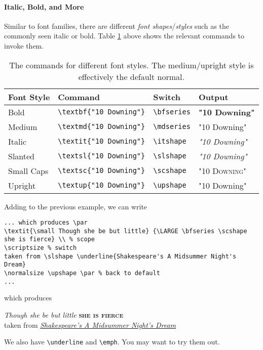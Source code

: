 \paragraph{Italic, Bold, and More}
Similar to font families, there are different \textit{font shapes}/\textit{styles} such as the commonly seen italic or bold. Table \ref{tab:fontshape} above shows the relevant commands to invoke them.
\begin{table}
\begin{tabularx}{\textwidth}{|l|X|l|l|}
\hline
Font Style & Command & Switch & Output \\
\hline
Bold & \texttt{\textbackslash textbf\{"10 Downing"\}}& \texttt{\textbackslash bfseries} & \textbf{"10 Downing"} \\
\hline
Medium & \texttt{\textbackslash textmd\{"10 Downing"\}}& \texttt{\textbackslash mdseries} & \textmd{"10 Downing"} \\
\hline
Italic & \texttt{\textbackslash textit\{"10 Downing"\}}& \texttt{\textbackslash itshape} & \textit{"10 Downing"} \\
\hline
Slanted & \texttt{\textbackslash textsl\{"10 Downing"\}}& \texttt{\textbackslash slshape} & \textsl{"10 Downing"} \\
\hline
Small Caps & \texttt{\textbackslash textsc\{"10 Downing"\}}& \texttt{\textbackslash scshape} & \textsc{"10 Downing"} \\
\hline
Upright & \texttt{\textbackslash textup\{"10 Downing"\}}& \texttt{\textbackslash upshape} & \textup{"10 Downing"} \\
\hline
\end{tabularx}
\caption{The commands for different font styles. The medium/upright style is effectively the default normal.}
\label{tab:fontshape}
\end{table}
Adding to the previous example, we can write
\begin{lstlisting}
... which produces \par
\textit{\small Though she be but little} {\LARGE \bfseries \scshape she is fierce} \\ % scope
\scriptsize % switch
taken from \slshape \underline{Shakespeare's A Midsummer Night's Dream}
\normalsize \upshape \par % back to default
...
\end{lstlisting}
which produces \par
\textit{\small Though she be but little} {\LARGE \bfseries \scshape she is fierce} \\
\scriptsize
taken from \slshape \underline{Shakespeare's A Midsummer Night's Dream}
\normalsize \upshape \par
We also have \texttt{\textbackslash underline} and \texttt{\textbackslash emph}. You may want to try them out.

